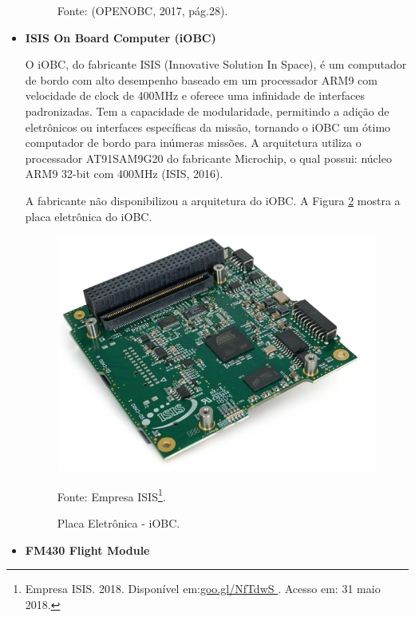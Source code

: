 \begin{itemize}
\begin{figure}[h]
	Fonte: (OPENOBC, 2017, pág.28). \linebreak
	
	\label{fig13}
\end{figure}


\item \textbf{ISIS On Board Computer (iOBC)}

O iOBC, do fabricante  ISIS (Innovative Solution In Space), é um computador de bordo com alto desempenho baseado em um processador ARM9 com velocidade de clock de 400MHz e oferece uma infinidade de interfaces padronizadas. Tem a capacidade de modularidade, permitindo a adição de eletrônicos ou interfaces específicas da missão, tornando o iOBC um ótimo computador de bordo para inúmeras missões.	A arquitetura utiliza o processador AT91SAM9G20 do fabricante Microchip, o qual possui: núcleo ARM9 32-bit com 400MHz (ISIS, 2016).

A fabricante não disponibilizou a arquitetura do iOBC. A Figura \ref{fig14} mostra a placa eletrônica do iOBC. 

\begin{figure}[h]
	\centering
    \caption{Placa Eletrônica - iOBC.}
    
	\includegraphics[keepaspectratio=true,scale=0.44]{figuras/isis.PNG}
	
	Fonte: Empresa ISIS\footnote{Empresa ISIS. 2018. Disponível em:\url{goo.gl/NfTdwS
		}. Acesso em: 31 maio 2018.}. \linebreak
	
	\label{fig14}
\end{figure}

\newpage
\item \textbf{FM430 Flight Module}


\end{itemize}
